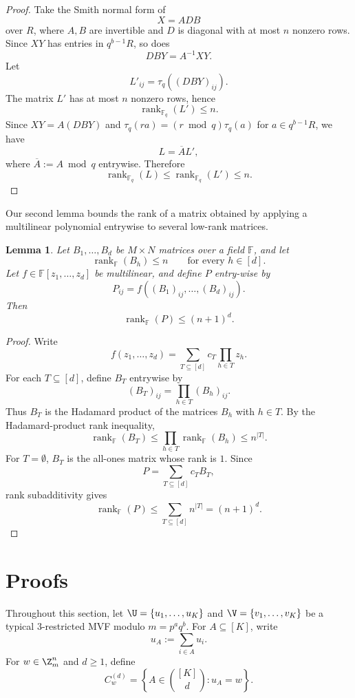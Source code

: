 \documentclass[11pt]{article}
\newtheorem{lemma}[maintheorem]{Lemma}
\theoremstyle{definition}
\begin{document}
\begin{proof}
Take the Smith normal form of
\[
X=ADB
\]
over $R$, where $A,B$ are invertible and $D$ is diagonal with at most $n$ nonzero rows. Since $XY$ has entries in $q^{b-1}R$, so does
\[
DBY=A^{-1}XY.
\]
Let
\[
L'_{ij}=\tau_q((DBY)_{ij}).
\]
The matrix $L'$ has at most $n$ nonzero rows, hence
\[
\operatorname{rank}_{\mathbb F_q}(L')\le n.
\]
Since $XY=A(DBY)$ and $\tau_q(ra)=(r\bmod q)\tau_q(a)$ for $a\in q^{b-1}R$, we have
\[
L=\overline A L',
\]
where $\overline A := A \bmod q$ entrywise. Therefore
\[
\operatorname{rank}_{\mathbb F_q}(L)\le \operatorname{rank}_{\mathbb F_q}(L')\le n.
\]
\end{proof}

Our second lemma bounds the rank of a matrix obtained by applying a multilinear polynomial entrywise to several low-rank matrices. 

\begin{lemma} \label{lem:polynomial_rank}
Let $B_1,\ldots,B_d$ be $M\times N$ matrices over a field $\mathbb F$, and let
\[
\operatorname{rank}_{\mathbb F}(B_h)\le n
\qquad
\text{for every }h\in[d].
\]
Let $f\in\mathbb F[z_1,\ldots,z_d]$ be multilinear, and define $P$ entry-wise by
\[
P_{ij}=f((B_1)_{ij},\ldots,(B_d)_{ij}).
\]
Then
\[
\operatorname{rank}_{\mathbb F}(P)\le (n+1)^d.
\]
\end{lemma}

\begin{proof}
Write
\[
f(z_1,\ldots,z_d)=\sum_{T\subseteq[d]} c_T\prod_{h\in T}z_h.
\]
For each $T\subseteq[d]$, define $B_T$ entrywise by
\[
(B_T)_{ij}=\prod_{h\in T}(B_h)_{ij}.
\]
Thus $B_T$ is the Hadamard product of the matrices $B_h$ with $h\in T$. By the Hadamard-product rank inequality,
\[
\operatorname{rank}_{\mathbb F}(B_T)
\le
\prod_{h\in T}\operatorname{rank}_{\mathbb F}(B_h)
\le n^{|T|}.
\]
For $T=\emptyset$, $B_T$ is the all-ones matrix whose rank is $1$. Since
\[
P=\sum_{T\subseteq[d]} c_T B_T,
\]
rank subadditivity gives
\[
\operatorname{rank}_{\mathbb F}(P)
\le
\sum_{T\subseteq[d]} n^{|T|}
=
(n+1)^d.
\]
\end{proof}
\section{Proofs}

Throughout this section, let $\U = \{u_1, \dots, u_K\}$ and $\V = \{v_1, \dots, v_K\}$ be a typical $3$-restricted MVF modulo $m=p^aq^b$. For $A\subseteq [K]$, write
\[
u_A:=\sum_{i\in A}u_i.
\]
For $w\in\Z_m^n$ and $d\ge 1$, define
\[
C_w^{(d)}
=
\left\{A\in\binom{[K]}d:u_A=w\right\}.
\]
\end{document}
